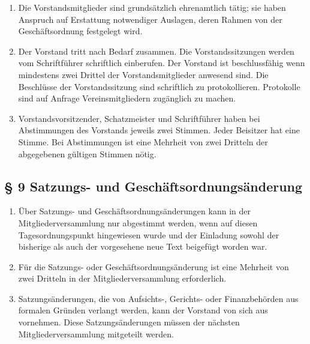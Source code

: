 ﻿\documentclass[10pt,a4paper]{scrartcl}
\begin{document}
\begin{enumerate}
	\item Die Vorstandsmitglieder sind grundsätzlich ehrenamtlich tätig; sie haben Anspruch
		auf Erstattung notwendiger Auslagen, deren Rahmen von der Geschäftsordnung
		festgelegt wird.
    \item Der Vorstand tritt nach Bedarf zusammen. Die Vorstandssitzungen
    werden vom Schriftführer schriftlich einberufen. Der Vorstand ist
    beschlussfähig wenn mindestens zwei Drittel der Vorstandsmitglieder
    anwesend sind. Die Beschlüsse der Vorstandssitzung sind schriftlich zu
    protokollieren. Protokolle sind auf Anfrage Vereinsmitgliedern zugänglich zu machen.
    \item Vorstandsvorsitzender, Schatzmeister und Schriftführer haben bei
    Abstimmungen des Vorstands jeweils zwei Stimmen. Jeder Beisitzer hat eine
    Stimme. Bei Abstimmungen ist eine Mehrheit von zwei Dritteln der
    abgegebenen gültigen Stimmen nötig.
\end{enumerate}
%
%
\subsection*{§ 9 Satzungs- und Geschäftsordnungsänderung}
\begin{enumerate}
	\item Über Satzungs- und Geschäftsordnungsänderungen kann in der Mitgliederversammlung
		nur abgestimmt werden, wenn auf diesen Tagesordnungspunkt hingewiesen wurde und der
		Einladung sowohl der bisherige als auch der vorgesehene neue Text beigefügt
		worden war.
	\item Für die Satzungs- oder Geschäftsordnungsänderung ist eine Mehrheit von zwei
		Dritteln in der Mitgliederversammlung erforderlich.
	\item Satzungsänderungen, die von Aufsichts-, Gerichts- oder Finanz\-be\-hör\-den aus formalen
		Grün\-den verlangt werden, kann der Vorstand von sich aus vornehmen. Diese
		Sat\-zungs\-än\-der\-ung\-en müs\-sen der nächs\-ten Mitgliederversammlung mitgeteilt
		werden.
\end{enumerate}
%
%
\end{document}

